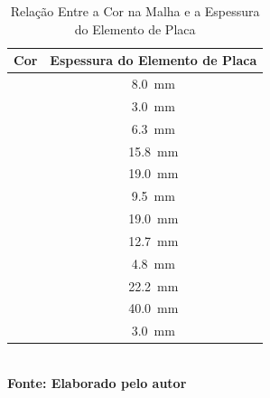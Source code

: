 		\begin{table}[!ht]
			\centering
			\caption[\hspace{0.1cm} Relação Entre a Cor na Malha e a Espessura do Elemento de Placa]{Relação Entre a Cor na Malha e a Espessura do Elemento de Placa}
			\vspace{-0.3cm} %
			\begin{tabular}{c|c}
				\hline
				\textbf{Cor} & \textbf{Espessura do Elemento de Placa} \\
				\hline
					\cellcolor{cor1} & \SI[{scientific-notation = engineering}]{8.0}{\milli\meter} \\
					\cellcolor{cor2} & \SI[{scientific-notation = engineering}]{3.0}{\milli\meter} \\
					\cellcolor{cor3} & \SI[{scientific-notation = engineering}]{6.3}{\milli\meter} \\
					\cellcolor{cor4} & \SI[{scientific-notation = engineering}]{15.8}{\milli\meter} \\
					\cellcolor{cor5} & \SI[{scientific-notation = engineering}]{19.0}{\milli\meter} \\
					\cellcolor{cor6} & \SI[{scientific-notation = engineering}]{9.5}{\milli\meter} \\
					\cellcolor{cor7} & \SI[{scientific-notation = engineering}]{19.0}{\milli\meter} \\
					\cellcolor{cor8} & \SI[{scientific-notation = engineering}]{12.7}{\milli\meter} \\
					\cellcolor{cor9} & \SI[{scientific-notation = engineering}]{4.8}{\milli\meter} \\
					\cellcolor{cor10} & \SI[{scientific-notation = engineering}]{22.2}{\milli\meter} \\
					\cellcolor{cor11} & \SI[{scientific-notation = engineering}]{40.0}{\milli\meter} \\
					\cellcolor{cor12} & \SI[{scientific-notation = engineering}]{3.0}{\milli\meter} \\
				\hline
			\end{tabular}
			\\
			\small{\textbf{\footnotesize Fonte: Elaborado pelo autor}}
			\label{tab1}
		\end{table}
			
